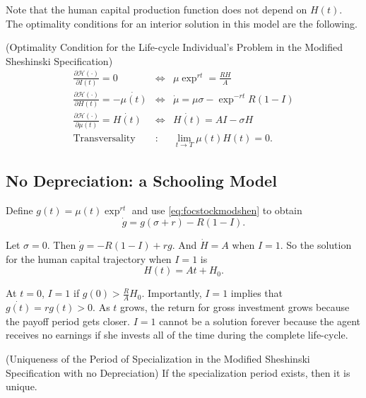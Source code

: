 \indent Note that the human capital production function does not depend on $H(t)$. The optimality conditions for an interior solution in this model are the following.
\begin{condition} (Optimality Condition for the Life-cycle Individual's Problem in the Modified Sheshinski Specification)
\begin{eqnarray}
\frac{\partial \mathcal{H} (\cdot)}{\partial I(t)} = 0 &\Leftrightarrow& \mu \exp^{rt} = \frac{RH}{A} \label{eq:focinvestmentmodsehn} \\
\frac{\partial \mathcal{H} (\cdot)}{\partial H(t)} = - \dot{\mu(t)} &\Leftrightarrow& \dot{\mu} = \mu \sigma - \exp^{-rt} R (1 - I) \label{eq:focstockmodshen} \\ 
\frac{\partial \mathcal{H} (\cdot)}{\partial \mu(t)} = \dot{H(t)} &\Leftrightarrow& \dot{H(t)} = AI - \sigma H \label{eq:focmotionmodshen} \\
\text{Transversality} &:& \lim_{t \rightarrow T} \mu(t) H(t) = 0. \label{eq:foctransversalitymodshen}
\end{eqnarray}
\end{condition}

\subsection{No Depreciation: a Schooling Model}
\indent Define $g(t) = \mu(t) \exp^{rt}$ and use \eqref{eq:focstockmodshen} to obtain
\begin{equation}
\dot{g} = g(\sigma + r) - R(1 - I). \label{eq:gmodshen}
\end{equation}

\noindent Let $\sigma = 0 $. Then $\dot{g} = -R(1 - I) + rg$. And $\dot{H} = A$ when $I=1$. So the solution for the human capital trajectory when $I = 1$ is
\begin{equation}
H(t) = At + H_{0} \label{eq:humancapshenmod}.
\end{equation} 

\noindent At $t = 0$, $I = 1$ if $g(0) > \frac{R}{A} H_{0}$. Importantly, $I = 1$ implies that $\dot{g(t)} = r g(t) > 0$. As $t$ grows, the return for gross investment grows because the payoff period gets closer. $I = 1$ cannot be a solution forever because the agent receives no earnings if she invests all of the time during the complete life-cycle.\\
\begin{claim} (Uniqueness of the Period of Specialization in the Modified Sheshinski Specification with no Depreciation)
If the specialization period exists, then it is unique.
\end{claim}

